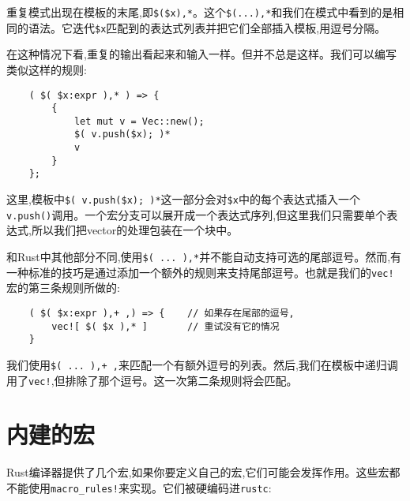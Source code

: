 重复模式出现在模板的末尾,即\texttt{\$(\$x),*}。这个\texttt{\$(...),*}和我们在模式中看到的是相同的语法。它迭代\texttt{\$x}匹配到的表达式列表并把它们全部插入模板,用逗号分隔。

在这种情况下看,重复的输出看起来和输入一样。但并不总是这样。我们可以编写类似这样的规则:
\begin{verbatim}
    ( $( $x:expr ),* ) => {
        {
            let mut v = Vec::new();
            $( v.push($x); )*
            v
        }
    };
\end{verbatim}

这里,模板中\texttt{\$( v.push(\$x); )*}这一部分会对\texttt{\$x}中的每个表达式插入一个\texttt{v.push()}调用。一个宏分支可以展开成一个表达式序列,但这里我们只需要单个表达式,所以我们把vector的处理包装在一个块中。

和Rust中其他部分不同,使用\texttt{\$( ... ),*}并不能自动支持可选的尾部逗号。然而,有一种标准的技巧是通过添加一个额外的规则来支持尾部逗号。也就是我们的\texttt{vec!}宏的第三条规则所做的:
\begin{verbatim}
    ( $( $x:expr ),+ ,) => {    // 如果存在尾部的逗号,
        vec![ $( $x ),* ]       // 重试没有它的情况
    }
\end{verbatim}

我们使用\texttt{\$( ... ),+ ,}来匹配一个有额外逗号的列表。然后,我们在模板中递归调用了\texttt{vec!},但排除了那个逗号。这一次第二条规则将会匹配。

\section{内建的宏}
Rust编译器提供了几个宏,如果你要定义自己的宏,它们可能会发挥作用。这些宏都不能使用\texttt{macro\_rules!}来实现。它们被硬编码进\texttt{rustc}:






